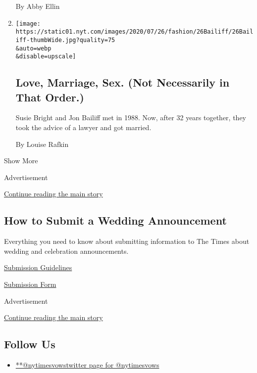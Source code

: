 \begin{enumerate}
  By Abby Ellin
\item
  \href{/2020/07/24/fashion/weddings/love-marriage-sex-not-necessarily-in-that-order.html}{}

  \texttt{[image: https://static01.nyt.com/images/2020/07/26/fashion/26Bailiff/26Bailiff-thumbWide.jpg?quality=75\\\&auto=webp\\\&disable=upscale]}

  \hypertarget{love-marriage-sex-not-necessarily-in-that-order}{%
  \subsection{Love, Marriage, Sex. (Not Necessarily in That
  Order.)}\label{love-marriage-sex-not-necessarily-in-that-order}}

  Susie Bright and Jon Bailiff met in 1988. Now, after 32 years
  together, they took the advice of a lawyer and got married.

  By Louise Rafkin
\end{enumerate}

Show More

Advertisement

\protect\hyperlink{after-mid5}{Continue reading the main story}

\hypertarget{how-to-submit-a-wedding-announcement}{%
\subsection{How to Submit a Wedding
Announcement}\label{how-to-submit-a-wedding-announcement}}

Everything you need to know about submitting information to The Times
about wedding and celebration announcements.

\href{https://www.nytimes.com/2018/01/09/fashion/weddings/wedding-submission-faqs.html}{Submission
Guidelines}

\href{http://www.nytimes.com/style/weddings/announcements}{Submission
Form}

Advertisement

\protect\hyperlink{after-mktg}{Continue reading the main story}

\hypertarget{follow-us}{%
\subsection{Follow Us}\label{follow-us}}

\begin{itemize}
\tightlist
\item
  \href{https://twitter.com/nytimesvows}{**@nytimesvowstwitter page for
  @nytimesvows}
\end{itemize}

